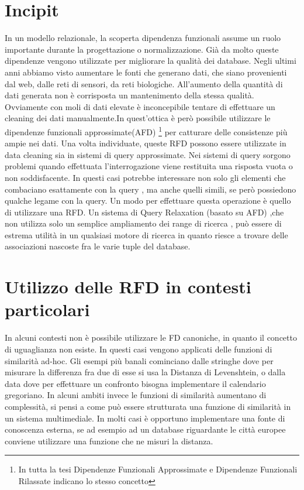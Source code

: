 \section{Incipit}

In un modello relazionale, la scoperta dipendenza funzionali assume un ruolo importante durante la progettazione o normalizzazione. Già da molto queste dipendenze vengono utilizzate per migliorare la qualità dei database.
Negli ultimi anni abbiamo visto aumentare le fonti che generano dati, che siano provenienti dal web, dalle reti di sensori, da reti biologiche. All’aumento della quantità di dati generata non è corrisposta un mantenimento della stessa qualità. Ovviamente con moli di dati elevate è inconcepibile tentare di effettuare un cleaning dei dati manualmente.In quest’ottica è però possibile utilizzare le dipendenze funzionali approssimate(AFD) \footnote{In tutta la tesi Dipendenze Funzionali Approssimate e Dipendenze Funzionali Rilassate indicano lo stesso concetto} per catturare delle consistenze più ampie nei dati.
Una volta individuate, queste RFD possono essere utilizzate in data cleaning sia in sistemi di query approssimate. Nei sistemi di query sorgono problemi quando effettuata l'interrogazione viene restituita una risposta vuota o non soddisfacente. In questi casi potrebbe interessare non solo gli elementi che combaciano esattamente con la query , ma anche quelli simili, se però possiedono qualche legame con la query. Un modo per effettuare questa operazione è quello di utilizzare una RFD.
Un sistema di Query Relaxation (basato su AFD) ,che non utilizza solo un semplice ampliamento dei range di ricerca , può essere di estrema utilità in un qualsiasi motore di ricerca in quanto riesce a trovare delle associazioni nascoste fra le varie tuple del database.

\section{Utilizzo delle RFD in contesti particolari}

In alcuni contesti non è possibile utilizzare le FD canoniche, in quanto il concetto di uguaglianza non esiste. In questi casi vengono applicati delle funzioni di similarità ad-hoc. Gli esempi più banali cominciano dalle stringhe dove per misurare la differenza fra due di esse si usa la Distanza di Levenshtein, o dalla data  dove per effettuare un confronto bisogna implementare il calendario gregoriano. In alcuni ambiti invece le funzioni di similarità aumentano di complessità, si pensi a come può essere strutturata una funzione di similarità in un sistema multimediale. In molti casi è opportuno implementare una fonte di conoscenza esterna, se ad esempio ad un database riguardante le città europee conviene utilizzare una funzione che ne misuri la distanza. 

